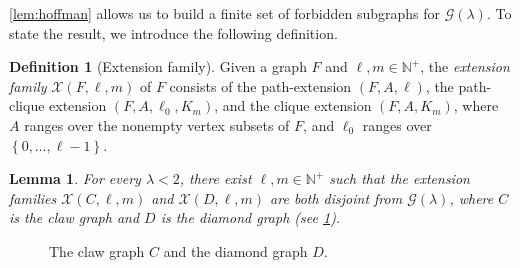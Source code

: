\documentclass[11pt]{article}
\newtheorem{lemma}[theorem]{Lemma}
\theoremstyle{definition}
\newtheorem{definition}[theorem]{Definition}
\theoremstyle{remark}
\newcommand{\sset}[1]{\left\{{#1}\right\}}
\newcommand{\la}{\lambda}
\newcommand{\G}{\mathcal{G}}
\newcommand{\N}{\mathbb{N}}
\newcommand{\X}{\mathcal{X}}
\newcommand{\Gl}{\G(\la)}
\begin{document}
\cref{lem:hoffman} allows us to build a finite set of forbidden subgraphs for $\Gl$. To state the result, we introduce the following definition.

\begin{definition}[Extension family] \label{def:extension-family}
    Given a graph $F$ and $\ell, m \in \N^+$, the \emph{extension family} $\X(F, \ell, m)$ of $F$ consists of the path-extension $(F, A, \ell)$, the path-clique extension $(F, A, \ell_0, K_m)$, and the clique extension $(F, A, K_m)$, where $A$ ranges over the nonempty vertex subsets of $F$, and $\ell_0$ ranges over $\sset{0, \dots, \ell-1}$.
\end{definition}

\begin{lemma} \label{lem:hoffman-extension}
    For every $\la < 2$, there exist $\ell, m \in \N^+$ such that the extension families $\X(C, \ell, m)$ and $\X(D, \ell, m)$ are both disjoint from $\Gl$, where $C$ is the claw graph and $D$ is the diamond graph (see \cref{fig:claw-and-diamond}).
\end{lemma}

\begin{figure}[t]
    \centering
    \caption{The claw graph $C$ and the diamond graph $D$.} \label{fig:claw-and-diamond}
\end{figure}
\end{document}
